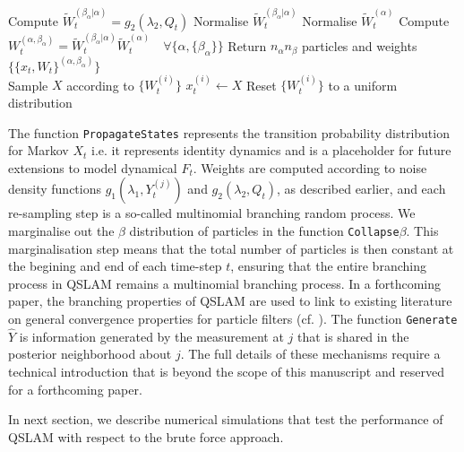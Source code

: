 \begin{algorithm}[H]
\begin{algorithmic}[0]
		\State Compute $\tilde{W}_t^{( \beta_\alpha | \alpha)} = g_2(\lambda_2, Q_t) $
		\EndFor
		\State Normalise $\tilde{W}_t^{( \beta_\alpha | \alpha)}$
		\EndFor
		\State Normalise $\tilde{W}_t^{( \alpha)}$
		\State Compute $W_t^{(\alpha, \beta_\alpha)} =  \tilde{W}_t^{( \beta_\alpha | \alpha)} \tilde{W}_t^{( \alpha)} \quad \forall \{\alpha, \{\beta_\alpha\} \}$
		\State Return $ n_\alpha n_\beta $ particles and weights $\{\{x_t, W_t\}^{(\alpha, \beta_\alpha)}\}$		
		\EndFunction 
		\\ \dotfill
		\State Sample $X$  according to $\{W_t^{(i)}\}$
		\State $x_t^{(i)} \gets X$
		\EndFor
		\State Reset $\{W_t^{(i)}\}$ to a uniform distribution
		\EndFunction 
	\end{algorithmic}	
\end{algorithm}
The function \texttt{PropagateStates} represents the transition probability distribution for Markov $X_t$ i.e. it represents identity dynamics and is a placeholder for future extensions to model dynamical $F_t$. Weights are computed according to noise density functions  $g_1(\lambda_1, Y_t^{(j)})$ and $g_2(\lambda_2, Q_t)$, as described earlier, and each re-sampling step is a so-called multinomial branching random process. We marginalise out the $\beta$ distribution of particles in the function \texttt{Collapse$\beta$}. This marginalisation step  means that the total number of particles is then constant at the begining and end of each time-step $t$, ensuring that the entire branching process in QSLAM remains a multinomial branching process. In a forthcoming paper, the branching properties of QSLAM are used to link to existing literature on general convergence properties for particle filters (cf. \cite{bain2009}).  The function \texttt{Generate$\hat{Y}$} is information generated by the measurement at $j$ that is shared in the posterior neighborhood about $j$. The full details of these mechanisms require a technical introduction that is beyond the scope of this manuscript and reserved for a forthcoming paper. 

In next section, we describe numerical simulations that test the performance of QSLAM with respect to the brute force approach. 


